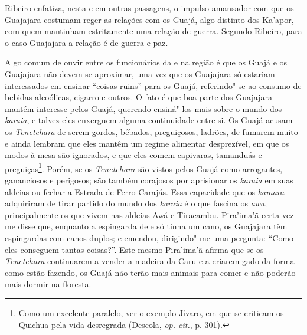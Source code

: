 Ribeiro enfatiza, nesta e em outras passagens, o impulso amansador com
que os Guajajara costumam reger as relações com os Guajá, algo distinto
dos Ka'apor, com quem mantinham estritamente uma relação de guerra.
Segundo Ribeiro, para o caso Guajajara a relação é de guerra e paz.

Algo comum de ouvir entre os funcionários da  e  na região é
que os Guajá e os Guajajara não devem se aproximar, uma vez que os
Guajajara só estariam interessados em ensinar ``coisas ruins'' para os
Guajá, referindo"-se ao consumo de bebidas alcoólicas, cigarro e outros.
O fato é que boa parte dos Guajajara mantém interesse pelos Guajá,
querendo ensiná"-los mais sobre o mundo dos \emph{karaia}, e talvez eles
enxerguem alguma continuidade entre si. Os Guajá acusam os
\emph{Tenetehara} de serem gordos, bêbados, preguiçosos, ladrões, de
fumarem muito e ainda lembram que eles mantêm um regime alimentar
desprezível, em que os modos à mesa são ignorados, e que eles comem
capivaras, tamanduás e preguiças\footnote{Como um excelente paralelo,
  ver o exemplo Jívaro, em que se criticam os Quichua pela vida
  desregrada (Descola, \emph{op. cit.}, p. 301).}. Porém, se os
\emph{Tenetehara} são vistos pelos Guajá como arrogantes, gananciosos e
perigosos; são também corajosos por aprisionar os \emph{karaia} em suas
aldeias ou fechar a Estrada de Ferro Carajás. Essa capacidade que os
\emph{kamara} adquiriram de tirar partido do mundo dos \emph{karaia} é o
que fascina os \emph{awa}, principalmente os que vivem nas aldeias
Awá e Tiracambu. Pira'ima'ã certa vez me disse que, enquanto a
espingarda dele só tinha um cano, os Guajajara têm espingardas com canos
duplos; e emendou, dirigindo"-me uma pergunta: ``Como eles conseguem
tantas coisas?''. Este mesmo Pira'ima'ã afirma que se os
\emph{Tenetehara} continuarem a vender a madeira da  Caru e a criarem
gado da forma como estão fazendo, os Guajá não terão mais animais para
comer e não poderão mais dormir na floresta.

